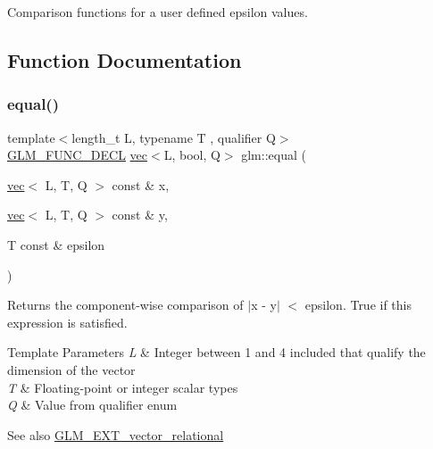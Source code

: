 Comparison functions for a user defined epsilon values. 

\subsection{Function Documentation}
\mbox{\label{group__ext__vector__relational_gae630b1f87fbd3b762ca46b0b8b32b02e}} 
\subsubsection{\texorpdfstring{equal()}{equal()}\hspace{0.1cm}{\footnotesize\ttfamily [1/3]}}
{\footnotesize\ttfamily template$<$length\+\_\+t L, typename T , qualifier Q$>$ \\
\mbox{\hyperlink{setup_8hpp_ab2d052de21a70539923e9bcbf6e83a51}{G\+L\+M\+\_\+\+F\+U\+N\+C\+\_\+\+D\+E\+CL}} \mbox{\hyperlink{structglm_1_1vec}{vec}}$<$L, bool, Q$>$ glm\+::equal (\begin{DoxyParamCaption}\item[{\mbox{\hyperlink{structglm_1_1vec}{vec}}$<$ L, T, Q $>$ const \&}]{x,  }\item[{\mbox{\hyperlink{structglm_1_1vec}{vec}}$<$ L, T, Q $>$ const \&}]{y,  }\item[{T const \&}]{epsilon }\end{DoxyParamCaption})}

Returns the component-\/wise comparison of $\vert$x -\/ y$\vert$ $<$ epsilon. True if this expression is satisfied.


\begin{DoxyTemplParams}{Template Parameters}
{\em L} & Integer between 1 and 4 included that qualify the dimension of the vector \\
\hline
{\em T} & Floating-\/point or integer scalar types \\
\hline
{\em Q} & Value from qualifier enum\\
\hline
\end{DoxyTemplParams}
\begin{DoxySeeAlso}{See also}
\mbox{\hyperlink{group__ext__vector__relational}{G\+L\+M\+\_\+\+E\+X\+T\+\_\+vector\+\_\+relational}} 
\end{DoxySeeAlso}
\mbox{\label{group__ext__vector__relational_ga6fb2432528edd028e3c2cf5b78d99797}} 
